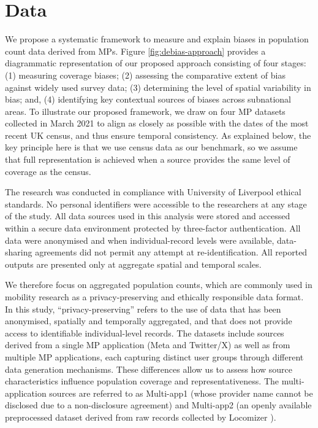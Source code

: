 \documentclass[]{rsos}%
\begin{document}
\section{Data}\label{sec-data}

We propose a systematic framework to measure and explain biases in
population count data derived from MPs. Figure
\ref{fig:debias-approach} provides a diagrammatic representation of our
proposed approach consisting of four stages: (1) measuring coverage
biases; (2) assessing the comparative extent of bias against widely used
survey data; (3) determining the level of spatial variability in bias;
and, (4) identifying key contextual sources of biases across subnational
areas. To illustrate our proposed framework, we draw on four MP datasets
collected in March 2021 to align as closely as possible with the dates
of the most recent UK census, and thus ensure temporal consistency. As
explained below, the key principle here is that we use census data as
our benchmark, so we assume that full representation is achieved when a
source provides the same level of coverage as the census.

The research was conducted in compliance with University of Liverpool
ethical standards. No personal identifiers were accessible to the
researchers at any stage of the study. All data sources used in this
analysis were stored and accessed within a secure data environment
protected by three-factor authentication. All data were anonymised and
when individual-record levels were available, data-sharing agreements
did not permit any attempt at re-identification. All reported outputs
are presented only at aggregate spatial and temporal scales.

We therefore focus on aggregated population counts, which are commonly
used in mobility research as a privacy-preserving and ethically
responsible data format. In this study, ``privacy-preserving'' refers to
the use of data that has been anonymised, spatially and temporally
aggregated, and that does not provide access to identifiable
individual-level records. The datasets include sources derived from a
single MP application (Meta and Twitter/X) as well as from multiple MP
applications, each capturing distinct user groups through different data
generation mechanisms. These differences allow us to assess how source
characteristics influence population coverage and representativeness.
The multi-application sources are referred to as Multi-app1 (whose
provider name cannot be disclosed due to a non-disclosure agreement) and
Multi-app2 (an openly available preprocessed dataset derived from raw
records collected by Locomizer \citep{zhong25}).
\end{document}
